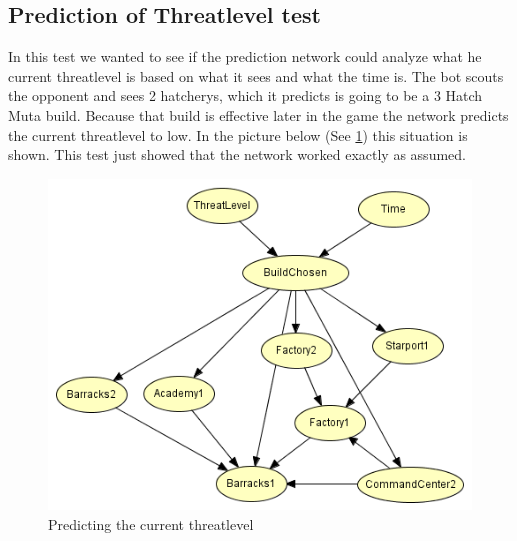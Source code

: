 	\subsection{Prediction of Threatlevel test}
		In this test we wanted to see if the prediction network could analyze what he current threatlevel is based on what it sees and what the time is.
		The bot scouts the opponent and sees 2 hatcherys, which it predicts is going to be a 3 Hatch Muta build. Because that build is effective later 
		in the game the network predicts the current threatlevel to low. In the picture below (See \ref{fig:predicting}) this situation is shown. 
		This test just showed that the network worked exactly as assumed.
		\begin{figure}
			\includegraphics[scale=1]{Figures/BayesianPictures/threatlevel.png}
			\caption{Predicting the current threatlevel}\label{fig:predicting}
		\end{figure}